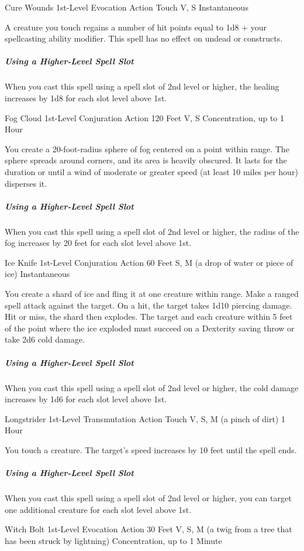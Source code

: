 \documentclass[letterpaper,openany,oneside,twocolumn]{book}
\begin{document}
\DndSpellHeader
  {Cure Wounds}
  {1st-Level Evocation}
  {Action}
  {Touch}
  {V, S}
  {Instantaneous}

A creature you touch regains a number of hit points equal to 1d8 + your spellcasting ability modifier. This spell has no effect on undead or constructs.

\subparagraph*{Using a Higher-Level Spell Slot} When you cast this spell using a spell slot of 2nd level or higher, the healing increases by 1d8 for each slot level above 1st.

\DndSpellHeader
  {Fog Cloud}
  {1st-Level Conjuration}
  {Action}
  {120 Feet}
  {V, S}
  {Concentration, up to 1 Hour}

You create a 20-foot-radius sphere of fog centered on a point within range. The sphere spreads around corners, and its area is heavily obscured. It lasts for the duration or until a wind of moderate or greater speed (at least 10 miles per hour) disperses it.

\subparagraph*{Using a Higher-Level Spell Slot} When you cast this spell using a spell slot of 2nd level or higher, the radius of the fog increases by 20 feet for each slot level above 1st.

\DndSpellHeader
  {Ice Knife}
  {1st-Level Conjuration}
  {Action}
  {60 Feet}
  {S, M (a drop of water or piece of ice)}
  {Instantaneous}

You create a shard of ice and fling it at one creature within range. Make a ranged spell attack against the target. On a hit, the target takes 1d10 piercing damage. Hit or miss, the shard then explodes. The target and each creature within 5 feet of the point where the ice exploded must succeed on a Dexterity saving throw or take 2d6 cold damage.

\subparagraph*{Using a Higher-Level Spell Slot} When you cast this spell using a spell slot of 2nd level or higher, the cold damage increases by 1d6 for each slot level above 1st.

\DndSpellHeader
  {Longstrider}
  {1st-Level Transmutation}
  {Action}
  {Touch}
  {V, S, M (a pinch of dirt)}
  {1 Hour}

You touch a creature. The target's speed increases by 10 feet until the spell ends.

\subparagraph*{Using a Higher-Level Spell Slot} When you cast this spell using a spell slot of 2nd level or higher, you can target one additional creature for each slot level above 1st.

\DndSpellHeader
  {Witch Bolt}
  {1st-Level Evocation}
  {Action}
  {30 Feet}
  {V, S, M (a twig from a tree that has been struck by lightning)}
  {Concentration, up to 1 Minute}
\end{document}
